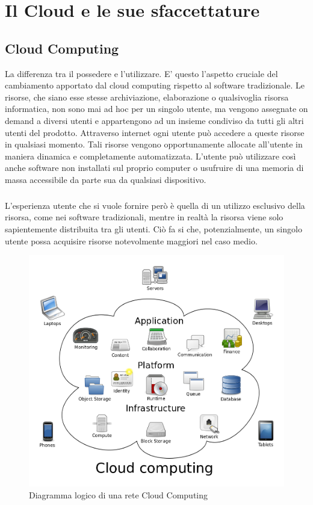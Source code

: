 \chapter{Il Cloud e le sue sfaccettature}

\section{Cloud Computing}
La differenza tra il possedere e l'utilizzare. E' questo l'aspetto cruciale del cambiamento apportato dal cloud computing rispetto al software tradizionale. Le risorse, che siano esse stesse archiviazione, elaborazione o qualsivoglia risorsa informatica, non sono mai ad hoc per un singolo utente, ma vengono assegnate on demand a diversi utenti e appartengono ad un insieme condiviso da tutti gli altri utenti del prodotto. Attraverso internet ogni utente può accedere a queste risorse in qualsiasi momento. Tali risorse vengono opportunamente allocate all'utente in maniera dinamica e completamente automatizzata. L'utente può utilizzare così anche software non installati sul proprio computer o usufruire di una memoria di massa accessibile da parte sua da qualsiasi dispositivo.
\paragraph{}
L'esperienza utente che si vuole fornire però è quella di un utilizzo esclusivo della risorsa, come nei software tradizionali, mentre in realtà la risorsa viene solo sapientemente distribuita tra gli utenti. Ciò fa si che, potenzialmente, un singolo utente possa acquisire risorse notevolmente maggiori nel caso medio.
\begin{figure}
	\centering
	\includegraphics[width=0.5\linewidth]{capitoli/imgs/CloudComputing}
	\caption{Diagramma logico di una rete Cloud Computing}
	\label{fig:cloudcomputing}
\end{figure}

